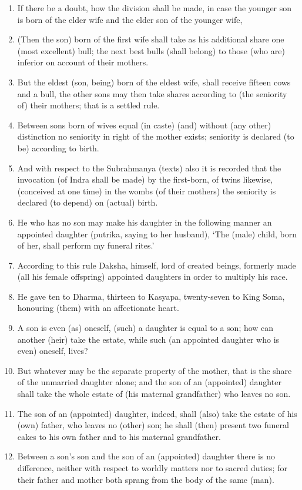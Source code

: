 \begin{enumerate}
\item If there be a doubt, how the division shall be made, in case the younger son is born of the elder wife and the elder son of the younger wife,
\item (Then the son) born of the first wife shall take as his additional share one (most excellent) bull; the next best bulls (shall belong) to those (who are) inferior on account of their mothers.
\item But the eldest (son, being) born of the eldest wife, shall receive fifteen cows and a bull, the other sons may then take shares according to (the seniority of) their mothers; that is a settled rule.
\item Between sons born of wives equal (in caste) (and) without (any other) distinction no seniority in right of the mother exists; seniority is declared (to be) according to birth.
\item And with respect to the Subrahmanya (texts) also it is recorded that the invocation (of Indra shall be made) by the first-born, of twins likewise, (conceived at one time) in the wombs (of their mothers) the seniority is declared (to depend) on (actual) birth.
\item He who has no son may make his daughter in the following manner an appointed daughter (putrika, saying to her husband), `The (male) child, born of her, shall perform my funeral rites.'
\item According to this rule Daksha, himself, lord of created beings, formerly made (all his female offspring) appointed daughters in order to multiply his race.
\item He gave ten to Dharma, thirteen to Kasyapa, twenty-seven to King Soma, honouring (them) with an affectionate heart.
\item A son is even (as) oneself, (such) a daughter is equal to a son; how can another (heir) take the estate, while such (an appointed daughter who is even) oneself, lives?
\item But whatever may be the separate property of the mother, that is the share of the unmarried daughter alone; and the son of an (appointed) daughter shall take the whole estate of (his maternal grandfather) who leaves no son.
\item The son of an (appointed) daughter, indeed, shall (also) take the estate of his (own) father, who leaves no (other) son; he shall (then) present two funeral cakes to his own father and to his maternal grandfather.
\item Between a son's son and the son of an (appointed) daughter there is no difference, neither with respect to worldly matters nor to sacred duties; for their father and mother both sprang from the body of the same (man).

\end{enumerate}
